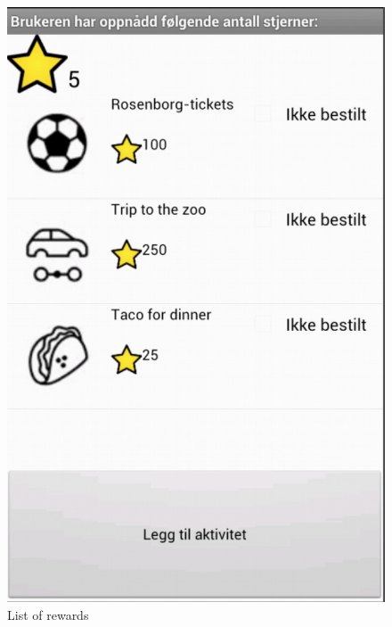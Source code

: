 \begin{figure}
		\begin{minipage}[b]{0.4\linewidth}
		\centering
			\includegraphics[width=0.20\paperwidth]{Pictures/app-screenshots/rewards.png}
		\caption{List of rewards}
		\label{fig:rewards}
	\end{minipage}
	\hspace{3cm}
		\begin{minipage}[b]{0.4\linewidth}
		\centering

\end{minipage}
\end{figure}
